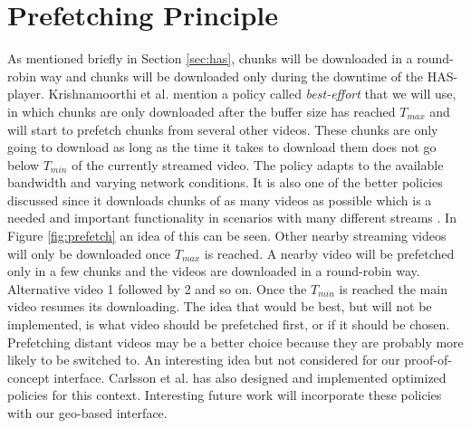 \section{Prefetching Principle}
\label{sec:prefetching}

As mentioned briefly in Section \ref{sec:has}, chunks will be downloaded in a round-robin way and chunks will be downloaded only during the downtime of the HAS-player. Krishnamoorthi et al. \cite{bandawarePrefetch} mention a policy called \textit{best-effort} that we will use, in which chunks are only downloaded after the buffer size has reached $T_{max}$ and will start to prefetch chunks from several other videos. These chunks are only going to download as long as the time it takes to download them does not go below $T_{min}$ of the currently streamed video. The policy adapts to the available bandwidth and varying network conditions. It is also one of the better policies discussed since it downloads chunks of as many videos as possible which is a needed and important functionality in  scenarios with many different streams \cite{bandawarePrefetch}. In Figure \ref{fig:prefetch} an idea of this can be seen. Other nearby streaming videos will only be downloaded once $T_{max}$ is reached. A nearby video will be prefetched only in a few chunks and the videos are downloaded in a round-robin way. Alternative video 1 followed by 2 and so on. Once the $T_{min}$ is reached the main video resumes its downloading. The idea that would be best, but will not be implemented, is what video should be prefetched first, or if it should be chosen. Prefetching distant videos may be a better choice because they are probably more likely to be switched to. An interesting idea but not considered for our proof-of-concept interface. Carlsson et al. \cite{optimizedstreaming} has also designed and implemented optimized policies for this context. Interesting future work will incorporate these policies with our geo-based interface.

